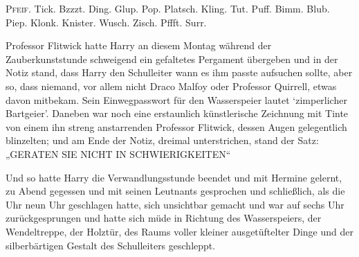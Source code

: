 

\lettrine{P}{feif.} Tick. Bzzzt. Ding. Glup. Pop. Platsch. Kling. Tut. Puff. Bimm. Blub. Piep. Klonk. Knister. Wusch. Zisch. Pffft. Surr.

Professor Flitwick hatte Harry an diesem Montag während der Zauberkunststunde schweigend ein gefaltetes Pergament übergeben und in der Notiz stand, dass Harry den Schulleiter wann es ihm passte aufsuchen sollte, aber so, dass niemand, vor allem nicht Draco Malfoy oder Professor Quirrell, etwas davon mitbekam. Sein Einwegpasswort für den Wasserspeier lautet `zimperlicher Bartgeier'.%
Daneben war noch eine erstaunlich künstlerische Zeichnung mit Tinte von einem ihn streng anstarrenden Professor Flitwick, dessen Augen gelegentlich blinzelten; und am Ende der Notiz, dreimal unterstrichen, stand der Satz: „GERATEN SIE NICHT IN SCHWIERIGKEITEN“

Und so hatte Harry die Verwandlungsstunde beendet und mit Hermine gelernt, zu Abend gegessen und mit seinen Leutnants gesprochen und schließlich, als die Uhr neun Uhr geschlagen hatte, sich unsichtbar gemacht und war auf sechs Uhr zurückgesprungen und hatte sich müde in Richtung des Wasserspeiers, der Wendeltreppe, der Holztür, des Raums voller kleiner ausgetüftelter Dinge und der silberbärtigen Gestalt des Schulleiters geschleppt.

